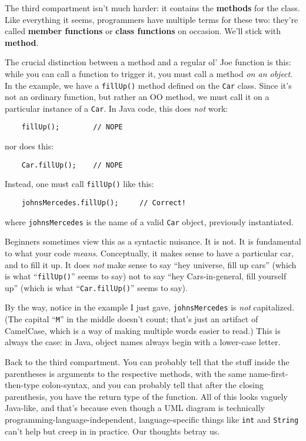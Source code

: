 The third compartment isn't much harder: it contains the \textbf{methods} for
the class. Like everything it seems, programmers have multiple terms for these
two: they're called \textbf{member functions} or \textbf{class functions} on
occasion. We'll stick with \textbf{method}.

The crucial distinction between a method and a regular ol' Joe function is
this: while you can call a function to trigger it, you must call a method
\textit{on an object}. In the example, we have a \texttt{fillUp()} method
defined on the \texttt{Car} class. Since it's not an ordinary function, but
rather an OO method, we must call it on a particular instance of a
\texttt{Car}. In Java code, this does \textit{not} work:

\begin{verbatim}
    fillUp();        // NOPE
\end{verbatim}

nor does this:

\begin{verbatim}
    Car.fillUp();    // NOPE
\end{verbatim}

Instead, one must call \texttt{fillUp()} like this:

\begin{verbatim}
    johnsMercedes.fillUp();     // Correct!
\end{verbatim}

where \texttt{johnsMercedes} is the name of a valid \texttt{Car} object,
previously instantiated.

Beginners sometimes view this as a syntactic nuisance. It is not. It is
fundamental to what your code \textit{means}. Conceptually, it makes sense to
have a particular car, and to fill it up. It does \textit{not} make sense to
say ``hey universe, fill up cars'' (which is what ``\texttt{fillUp()}'' seems to
say) not to say ``hey Cars-in-general, fill yourself up'' (which is what
``\texttt{Car.fillUp()}'' seems to say).

By the way, notice in the example I just gave, \texttt{johnsMercedes} is
\textit{not} capitalized. (The capital ``\texttt{M}'' in the middle doesn't
count; that's just an artifact of CamelCase, which is a way of making multiple
words easier to read.) This is always the case: in Java, object names always
begin with a lower-case letter.

Back to the third compartment. You can probably tell that the stuff inside the
parentheses is arguments to the respective methods, with the same
name-first-then-type colon-syntax, and you can probably tell that after the
closing parenthesis, you have the return type of the function. All of this
looks vaguely Java-like, and that's because even though a UML diagram is
technically programming-language-independent, language-specific things like
\texttt{int} and \texttt{String} can't help but creep in in practice. Our
thoughts betray us.

